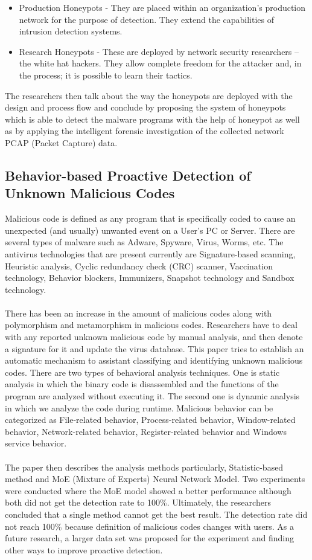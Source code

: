 \documentclass[11pt]{article}
\begin{document}
	\begin{itemize}
		\item Production Honeypots - They are placed within an organization’s production network for the purpose of detection. They extend the capabilities of intrusion detection systems.
		\item Research Honeypots - These are deployed by network security researchers – the white hat hackers. They allow complete freedom for the attacker and, in the process; it is possible to learn their tactics.
	\end{itemize}
	The researchers then talk about the way the honeypots are deployed with the design and process flow and conclude by proposing the system of honeypots which is able to detect the malware programs with the help of honeypot as well as by applying the intelligent forensic investigation of the collected network PCAP (Packet Capture) data.
	
	\subsection{Behavior-based Proactive Detection of Unknown Malicious Codes}
	
	Malicious code is defined as any program that is specifically coded to cause an unexpected (and usually) unwanted event on a User’s PC or Server. There are several types of malware such as Adware, Spyware, Virus, Worms, etc. The antivirus technologies that are present currently are Signature-based scanning,	Heuristic analysis, Cyclic redundancy check (CRC) scanner, Vaccination technology, Behavior blockers, Immunizers, Snapshot technology and Sandbox technology.\\ \\
	There has been an increase in the amount of malicious codes along with polymorphism and metamorphism in malicious codes. Researchers have to deal with any reported unknown malicious code by manual analysis, and then denote a signature for it and update the virus database. This paper tries to establish an automatic mechanism to assistant classifying and identifying unknown malicious codes. There are two types of behavioral analysis techniques. One is static analysis in which the binary code is disassembled and the functions of the program are analyzed without executing it. The second one is dynamic analysis in which we analyze the code during runtime. Malicious behavior can be categorized as File-related behavior, Process-related behavior, Window-related behavior, Network-related behavior, Register-related behavior and Windows service behavior.\\ \\
	The paper then describes the analysis methods particularly, Statistic-based method and MoE (Mixture of Experts) Neural Network Model. Two experiments were conducted where the MoE model showed a better performance although both did not get the detection rate to 100\%. Ultimately, the researchers concluded that a single method cannot get the best result.  The detection rate did not reach 100\% because definition of malicious codes changes with users. As a future research, a larger data set was proposed for the experiment and finding other ways to improve proactive detection.	
	
\end{document}
